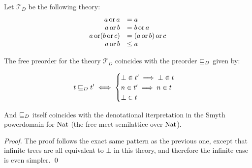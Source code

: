 \begin{alemma}
    \label{lem:demopreo}
    Let $\mathcal{T}_D$ be the following theory:
    \begin{equation*}
        \begin{array}{rl}
            a \operatorname{or} a &= a \\
            a \operatorname{or} b &= b \operatorname{or} a \\
            a \operatorname{or} (b \operatorname{or} c) &= (a \operatorname{or} b) \operatorname{or} c \\
            a \operatorname{or} b &\leq a
        \end{array}
    \end{equation*}

    The free preorder for the theory $\mathcal{T}_D$ coincides with 
    the preorder $\sqsubseteq_D$ given by:

    \begin{equation*}
        t \sqsubseteq_D t' \iff 
        \begin{cases}
            \bot \in t' \implies \bot \in t \\
            n    \in t' \implies n \in t    \\
            \bot \in t
        \end{cases}
    \end{equation*}

    And $\sqsubseteq_D$ itself coincides with the denotational
    iterpretation in the Smyth powerdomain for $\textnormal{Nat}$
    (the free meet-semilattice over $\textnormal{Nat}$).
\end{alemma}

\begin{proof}
    The proof follows the exact same pattern as the previous one,
    except that infinite trees are all equivalent to $\bot$ 
    in this theory, and therefore the infinite case is even 
    simpler.
\qed\end{proof}


